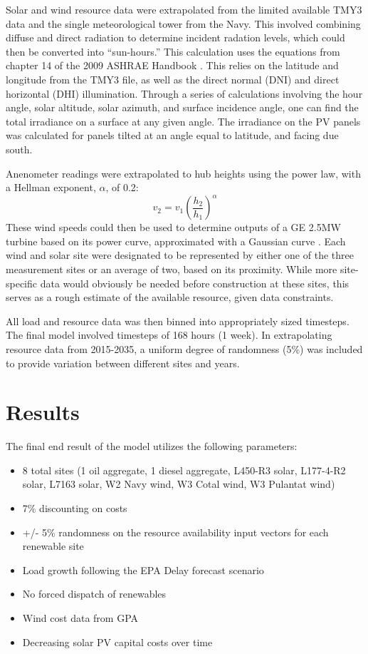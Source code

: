 \documentclass[12pt,letterpaper,fleqn]{article}
\begin{document}
Solar and wind resource data were extrapolated from the limited
available TMY3 data and the single meteorological tower from the
Navy. This involved combining diffuse and direct radiation to
determine incident radation levels, which could then be converted into
``sun-hours.'' This calculation uses the equations from chapter 14 of the 
2009 ASHRAE Handbook \cite{ashrae}. This relies on the latitude and longitude 
from the TMY3 file, as well as the direct normal (DNI) and direct horizontal (DHI) 
illumination. Through a series of calculations involving the hour angle, solar 
altitude, solar azimuth, and surface incidence angle, one can find the total
irradiance on a surface at any given angle. The irradiance on the PV panels was 
calculated for panels tilted at an angle equal to latitude, and facing due south.

Anenometer readings were extrapolated to hub heights
using the power law, with a Hellman exponent, $\alpha$, of 0.2:
\[v_2 = v_1\left(\frac{h_2}{h_1}\right)^\alpha\] 
These wind speeds could then be used to determine outputs of a GE
2.5MW turbine based on its power curve, approximated with a Gaussian
curve \cite{ge}. Each wind and solar site were designated to be
represented by either one of the three measurement sites or an average
of two, based on its proximity. While more site-specific data would
obviously be needed before construction at these sites, this serves as
a rough estimate of the available resource, given data constraints.

All load and resource data was then binned into appropriately sized
timesteps. The final model involved timesteps of 168 hours (1
week). In extrapolating resource data from 2015-2035, a uniform
degree of randomness (5\%) was included to provide variation between
different sites and years. 

\section{Results}

The final end result of the model utilizes the following parameters:
\begin{itemize}
\item 8 total sites (1 oil aggregate, 1 diesel aggregate, L450-R3
  solar, L177-4-R2 solar, L7163 solar, W2 Navy wind, W3 Cotal wind, W3
  Pulantat wind)
\item 7\% discounting on costs
\item +/- 5\% randomness on the resource availability input vectors
  for each renewable site
\item Load growth following the EPA Delay forecast scenario
\item No forced dispatch of renewables
\item Wind cost data from GPA
\item Decreasing solar PV capital costs over time
\end{itemize}
\end{document}
